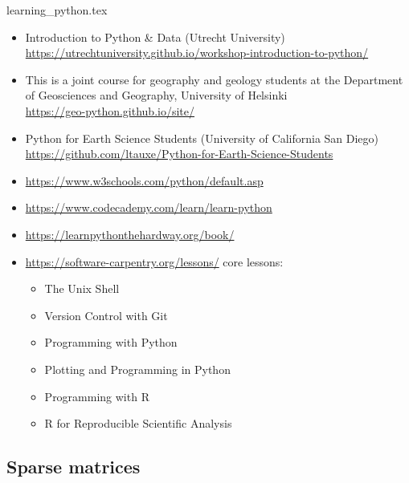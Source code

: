 \begin{flushright} {\tiny {\color{gray} learning\_python.tex}} \end{flushright}

\begin{itemize}
\item Introduction to Python \& Data (Utrecht University)\\
\url{https://utrechtuniversity.github.io/workshop-introduction-to-python/}

\item 
This is a joint course for geography and geology students at the Department of 
Geosciences and Geography, University of Helsinki\\
\url{https://geo-python.github.io/site/}

\item Python for Earth Science Students (University of California San Diego)\\
\url{https://github.com/ltauxe/Python-for-Earth-Science-Students}

\item \url{https://www.w3schools.com/python/default.asp}

\item \url{https://www.codecademy.com/learn/learn-python}

\item \url{https://learnpythonthehardway.org/book/}

\item \url{https://software-carpentry.org/lessons/} core lessons:
\begin{itemize}
\item The Unix Shell
\item Version Control with Git
\item Programming with Python
\item Plotting and Programming in Python
\item Programming with R
\item R for Reproducible Scientific Analysis
\end{itemize}


\end{itemize}

\subsection{Sparse matrices}

